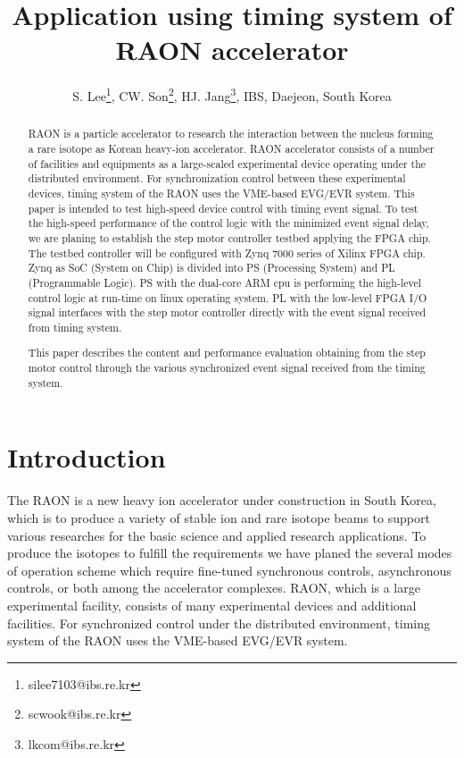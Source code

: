 \documentclass[a4paper,
              ]{jacow}
\begin{document}
\title{Application using timing system of RAON accelerator}
\author{S. Lee\thanks{silee7103@ibs.re.kr}, CW. Son\thanks{scwook@ibs.re.kr}, HJ. Jang\thanks{lkcom@ibs.re.kr}, IBS, Daejeon, South Korea\\
       }
\maketitle

%
\begin{abstract}
   RAON is a particle accelerator to research the interaction between the nucleus forming a rare isotope as Korean heavy-ion accelerator. RAON accelerator consists of a number of facilities and equipments as a large-scaled experimental device operating under the distributed environment. For synchronization control between these experimental devices, timing system of the RAON uses the VME-based EVG/EVR system. This paper is intended to test high-speed device control with timing event signal. To test the high-speed performance of the control logic with the minimized event signal delay, we are planing to establish the step motor controller testbed applying the FPGA chip. The testbed controller will be configured with Zynq 7000 series of Xilinx FPGA chip. Zynq as SoC (System on Chip) is divided into PS (Processing System) and PL (Programmable Logic). PS with the dual-core ARM cpu is performing the high-level control logic at run-time on linux operating system. PL with the low-level FPGA I/O signal interfaces with the step motor controller directly with the event signal received from timing system.
   
   This paper describes the content and performance evaluation obtaining from the step motor control through the various synchronized event signal received from the timing system.
\end{abstract}


\section{Introduction}
The RAON is a new heavy ion accelerator under construction in South Korea, which is to produce a variety of stable ion and rare isotope beams to support various researches for the basic science and applied research applications\cite{TSHOO:NIMB}. To produce the isotopes to fulfill the requirements we have planed the several modes of operation scheme which require fine-tuned synchronous controls, asynchronous controls, or both among the accelerator complexes. RAON, which is a large experimental facility, consists of many experimental devices and additional facilities. For synchronized control under the distributed environment, timing system of the RAON uses the VME-based EVG/EVR system.
\end{document}
